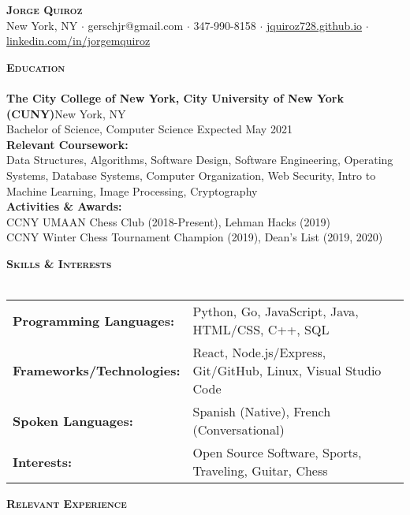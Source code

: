 \documentclass[a4paper]{article}
\newcommand{\lineunder} {
    \vspace*{-8pt} \\
    \hspace*{-18pt} \hrulefill \\
}
\newcommand{\header} [1] {
    {\hspace*{-18pt}\vspace*{6pt} \textsc{#1}}
    \vspace*{-6pt} \lineunder
}
\begin{document}
\vspace*{-40pt}

    

\vspace*{-50pt}
\begin{center}
	{\Huge \scshape {\textbf{Jorge Quiroz}}}\\
    \vspace{1mm}
	New York, NY $\cdot$ gerschjr@gmail.com $\cdot$ 347-990-8158 $\cdot$ \href{https://jquiroz728.github.io/}{jquiroz728.github.io} $\cdot$ \href{https://www.linkedin.com/in/jorgemquiroz/}{linkedin.com/in/jorgemquiroz}\\
\end{center}

\header{\textbf{Education}}
\textbf{The City College of New York, City University of New York (CUNY)}\hfill New York, NY\\
Bachelor of Science, Computer Science \hfill  Expected May 2021\\
\textbf{Relevant Coursework:} \\
Data Structures, Algorithms, Software Design, Software Engineering, Operating Systems, Database Systems, Computer Organization, Web Security, Intro to Machine Learning, Image Processing, Cryptography\\
\textbf{Activities \& Awards:} \\
CCNY UMAAN Chess Club (2018-Present), Lehman Hacks (2019)\\
CCNY Winter Chess Tournament Champion (2019), Dean's List (2019, 2020)
\vspace{2mm}

\header{\textbf{Skills \& Interests}}
\vspace{1mm}
\begin{tabular}{ l l }
	\textbf{Programming Languages:}   & Python, Go, JavaScript, Java, HTML/CSS, C++, SQL                  \\
	\textbf{Frameworks/Technologies:} & React, Node.js/Express, Git/GitHub, Linux, Visual Studio Code \\
	\textbf{Spoken Languages:}        & Spanish (Native), French (Conversational)                    \\
	\textbf{Interests:}               & Open Source Software, Sports, Traveling, Guitar, Chess           \\
\end{tabular}
\vspace{2mm}

\header{\textbf{Relevant Experience}}
\vspace{1mm}
\end{document}
